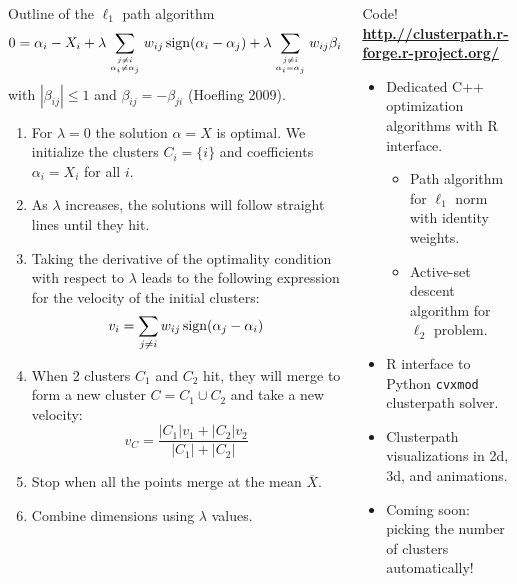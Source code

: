 \documentclass[final]{beamer}
\begin{document}
\begin{frame}{}
\begin{columns}[T]
\begin{column}{0.315\linewidth}
\begin{block}{Outline of the $\ell_1$ path algorithm}
$$0 = \alpha_i - X_i + 
\lambda \sum_{j\neq i\atop \alpha_i \neq \alpha_j}w_{ij}
\operatorname{sign}({\alpha_i-\alpha_j}) + 
\lambda \sum_{j\neq i \atop \alpha_i = \alpha_j}w_{ij} \beta_{ij},$$
with $|\beta_{ij}|\leq 1$ and $\beta_{ij}=-\beta_{ji}$ (Hoefling 2009).
\begin{enumerate}
\item For $\lambda=0$ the solution $\alpha=X$ is optimal. We
  initialize the clusters $C_i = \{i\}$ and coefficients $\alpha_i =
  X_i$ for all $i$.
\item As $\lambda$ increases, the solutions will follow straight
  lines until they hit.
\item Taking the derivative of the optimality condition with respect
  to $\lambda$ leads to the following expression for the velocity of
  the initial clusters:
$$v_i = \sum_{j\neq i}w_{ij}\operatorname{sign}(\alpha_j-\alpha_i)$$
\item When 2 clusters $C_1$ and $C_2$ hit, they will merge to form a
  new cluster $C = C_1\cup C_2$ and take a new velocity:
$$v_C = \frac{
|C_1|v_1 + |C_2|v_2
}{
|C_1|+|C_2|
}$$
\item Stop when all the points merge at the mean $\overline X$.
\item Combine dimensions using $\lambda$ values.
\end{enumerate}

\end{block}




\end{column}\hfill
\begin{column}{0.315\linewidth}
\begin{alertblock}{Code!
    \textbf{\url{http.//clusterpath.r-forge.r-project.org/}}}
\begin{itemize}
\item Dedicated C++ optimization algorithms with R interface.
  \begin{itemize}
  \item Path algorithm for $\ell_1$ norm with identity weights.
  \item Active-set descent algorithm for $\ell_2$ problem.
  \end{itemize}
\item R interface to Python \texttt{cvxmod} clusterpath solver.
\item Clusterpath visualizations in 2d, 3d, and animations.
\item Coming soon: picking the number of clusters automatically!
\end{itemize}
\end{alertblock}




\end{column}
\end{columns}
\end{frame}
\end{document}
